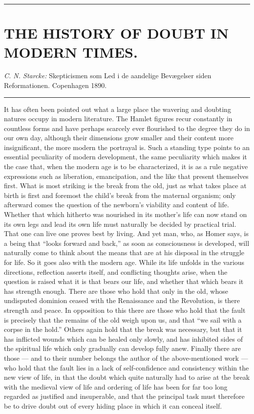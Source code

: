 \documentclass[12pt,a4paper,openany]{book}
\newcommand{\opage}[1]{\marginnote{\footnotesize\textit{[#1]}}}
\newcommand{\essay}[2][]{\chapter*{#2}\addcontentsline{toc}{chapter}{#1}}
\newcommand{\streg}{\begin{center}\rule{3em}{0.4pt}\end{center}}
\begin{document}
\streg{}

\opage{15}
\essay[The History of Doubt in Modern Times]{THE HISTORY OF DOUBT IN MODERN TIMES.}

\begin{center}\emph{C. N. Starcke:} Skepticismen som Led i de aandelige Bevægelser siden
Reformationen. Copenhagen 1890.\end{center}

\streg{}

It has often been pointed out what a large place the
wavering and doubting natures occupy in modern literature.
The Hamlet figures recur constantly in countless forms
and have perhaps scarcely ever flourished to the degree they do
in our own day, although their dimensions grow smaller and their
content more insignificant, the more modern the portrayal is. Such
a standing type points to an essential
peculiarity of modern development, the same
peculiarity which makes it the case that, when the modern age is to be characterized,
it is as a rule negative expressions such as liberation, emancipation,
and the like that present themselves first. What is most striking is
the break from the old, just as what takes place at
birth is first and foremost the child's break from the
maternal organism; only afterward comes the question of the
newborn's viability and content of life. Whether that which hitherto
was nourished in its mother's life can now stand on its own legs and
lead its own life must naturally be decided by practical trial.
That one can live one proves best by living. And yet
man, who, as Homer says, is a being that ``looks
forward and back,'' as soon as consciousness is developed,
will naturally come to think about the means that are at his
disposal in the struggle for life. So it goes also with the
modern age. While its life unfolds in the
various directions, reflection asserts itself, and
conflicting thoughts arise, when the question is raised
what it is that bears our life, and whether that which bears it
has strength enough. There are those who hold that only in the old,
\opage{16}whose undisputed dominion ceased with the Renaissance and
the Revolution, is there strength and peace. In opposition to this
there are those who hold that the fault is precisely that the remains of the
old weigh upon us, and that ``we sail with a corpse in the hold.''
Others again hold that the break was necessary, but that it
has inflicted wounds which can be healed only slowly, and has inhibited
sides of the spiritual life which only gradually can
develop fully anew. Finally there are those --- and to
their number belongs the author of the above-mentioned work ---
who hold that the fault lies in a lack of self-confidence and
consistency within the new view of life, in that the doubt which
quite naturally had to arise at the break with the
medieval view of life and ordering of life has been for far too long
regarded as justified and insuperable, and that the principal task
must therefore be to drive doubt out of every hiding place in which
it can conceal itself.
\end{document}
